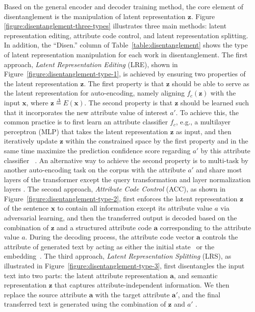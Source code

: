 \label{sec:manipulation}
Based on the general encoder and decoder training method, the core element of disentanglement is the manipulation of latent representation $\bm{z}$. Figure \ref{figure:disentanglement-three-types} illustrates three main methods: latent representation editing, attribute code control, and latent representation splitting. In addition, the ``Disen.'' column of Table~\ref{table:disentanglement} shows the type of latent representation manipulation for each work in disentanglement.
The first approach, \textit{Latent Representation Editing} (LRE), shown in Figure~\ref{figure:disentanglement-type-1}, is achieved by ensuring two properties of the latent representation $\bm{z}$. The first property is that $\bm{z}$ should be able to serve as the latent representation for auto-encoding, namely aligning $f_c(\bm{z})$ with the input $\bm{x}$, where $\bm{z} \overset{\Delta}{=} E(\bm{x})$.
The second property is that $\bm{z}$ should be learned such that it incorporates the new attribute value of interest $a'$. To achieve this, the common practice is to first learn an attribute classifier $f_c$, e.g., a multilayer perceptron (MLP) that takes the latent representation $\bm{z}$ as input, and then iteratively update $\bm{z}$ within the constrained space by the first property and in the same time maximize the prediction confidence score regarding $a'$ by this attribute classifier 
~. An alternative way to achieve the second property is to multi-task by another auto-encoding task on the corpus with the attribute $a'$ and share most layers of the transformer except the query transformation and layer normalization layers .
The second approach, \textit{Attribute Code Control} (ACC), as shown in Figure~\ref{figure:disentanglement-type-2}, first enforces the latent representation $\bm{z}$ of the sentence $\bm{x}$ to contain all information except its attribute value $a$ via adversarial learning, and then the transferred output is decoded based on the combination of $\bm{z}$ and a structured attribute code $\bm{a}$ corresponding to the attribute value $a$. During the decoding process, the attribute code vector $\bm{a}$ controls the attribute of generated text by acting as either the initial state~ or the embedding~. 
The third approach, \textit{Latent Representation Splitting} (LRS), as illustrated in Figure~\ref{figure:disentanglement-type-3}, first disentangles the input text into two parts: the latent attribute representation $\bm{a}$, and semantic representation $\bm{z}$ that captures attribute-independent information. We then replace the source attribute $\bm{a}$ with the target attribute $\bm{a}'$, and the final transferred text is generated using the combination of $\bm{z}$ and ${a}'$ .

